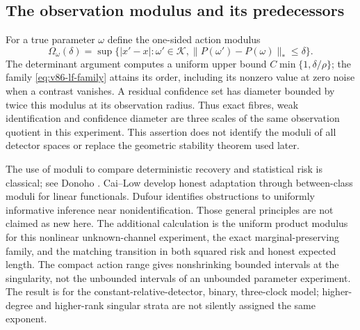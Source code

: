 \subsection{The observation modulus and its predecessors}
For a true parameter $\omega$ define the one-sided action modulus
\[
 \Omega_\omega(\delta)=\sup\{|x'-x|:\omega'\in\mathcal K,
                              \|P(\omega')-P(\omega)\|_*\le\delta\}.
\]
The determinant argument computes a uniform upper bound
$C\min\{1,\delta/\rho\}$; the family
\eqref{eq:v86-lf-family} attains its order, including its nonzero
value at zero noise when a contrast vanishes. A residual confidence
set has diameter bounded by twice this modulus at its observation
radius. Thus exact fibres, weak identification and confidence diameter
are three scales of the same observation quotient in this experiment.
This assertion does not identify the moduli of all detector spaces
or replace the geometric stability theorem used later.

The use of moduli to compare deterministic recovery and statistical
risk is classical; see Donoho \cite{V86Donoho}. Cai--Low
\cite{V86CaiLow} develop honest adaptation through between-class
moduli for linear functionals. Dufour \cite{V86Dufour} identifies
obstructions to uniformly informative inference near nonidentification.
Those general principles are not claimed as new here. The additional
calculation is the uniform product modulus for this nonlinear
unknown-channel experiment, the exact marginal-preserving family,
and the matching transition in both squared risk and honest expected
length. The compact action range gives nonshrinking bounded intervals
at the singularity, not the unbounded intervals of an unbounded
parameter experiment. The result is for the constant-relative-detector,
binary, three-clock model; higher-degree and higher-rank singular
strata are not silently assigned the same exponent.
